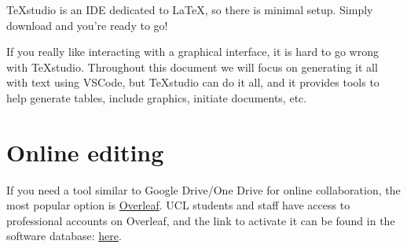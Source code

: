 TeXstudio is an IDE dedicated to \LaTeX{}, so there is minimal setup. Simply download and you're ready to go!

If you really like interacting with a graphical interface, it is hard to go wrong with TeXstudio.
Throughout this document we will focus on generating it all with text using VSCode, but TeXstudio can do it all, and it provides tools to help generate tables, include graphics, initiate documents, etc.

\section{Online editing}
If you need a tool similar to Google Drive/One Drive for online collaboration, the most popular option is \href{https://www.overleaf.com/}{Overleaf}.
UCL students and staff have access to professional accounts on Overleaf, and the link to activate it can be found in the software database: \href{https://swdb.ucl.ac.uk/package/view/id/1235}{here}.